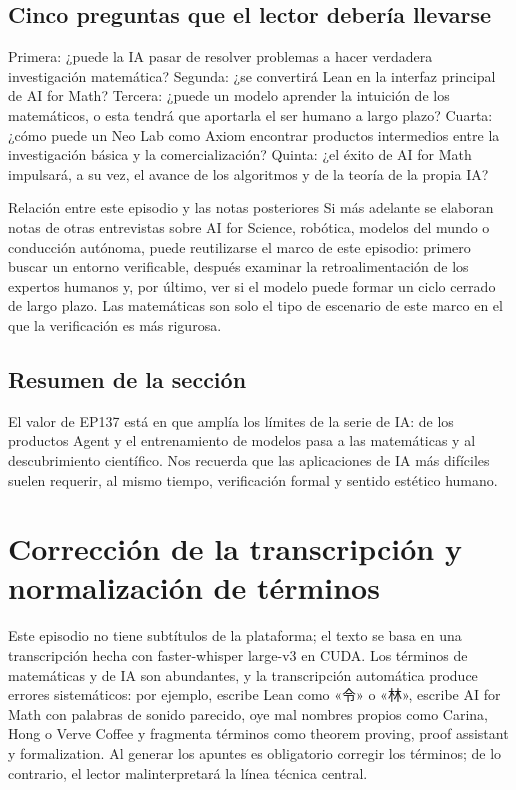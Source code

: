\documentclass[a4paper]{article}
\begin{document}
\subsection{Cinco preguntas que el lector debería llevarse}

Primera: ¿puede la IA pasar de resolver problemas a hacer verdadera investigación matemática? Segunda: ¿se convertirá Lean en la interfaz principal de AI for Math? Tercera: ¿puede un modelo aprender la intuición de los matemáticos, o esta tendrá que aportarla el ser humano a largo plazo? Cuarta: ¿cómo puede un Neo Lab como Axiom encontrar productos intermedios entre la investigación básica y la comercialización? Quinta: ¿el éxito de AI for Math impulsará, a su vez, el avance de los algoritmos y de la teoría de la propia IA?

\begin{knowledgebox}{Relación entre este episodio y las notas posteriores}
Si más adelante se elaboran notas de otras entrevistas sobre AI for Science, robótica, modelos del mundo o conducción autónoma, puede reutilizarse el marco de este episodio: primero buscar un entorno verificable, después examinar la retroalimentación de los expertos humanos y, por último, ver si el modelo puede formar un ciclo cerrado de largo plazo. Las matemáticas son solo el tipo de escenario de este marco en el que la verificación es más rigurosa.
\end{knowledgebox}

\subsection{Resumen de la sección}

El valor de EP137 está en que amplía los límites de la serie de IA: de los productos Agent y el entrenamiento de modelos pasa a las matemáticas y al descubrimiento científico. Nos recuerda que las aplicaciones de IA más difíciles suelen requerir, al mismo tiempo, verificación formal y sentido estético humano.
\section{Corrección de la transcripción y normalización de términos}

Este episodio no tiene subtítulos de la plataforma; el texto se basa en una transcripción hecha con faster-whisper large-v3 en CUDA. Los términos de matemáticas y de IA son abundantes, y la transcripción automática produce errores sistemáticos: por ejemplo, escribe Lean como «令» o «林», escribe AI for Math con palabras de sonido parecido, oye mal nombres propios como Carina, Hong o Verve Coffee y fragmenta términos como theorem proving, proof assistant y formalization. Al generar los apuntes es obligatorio corregir los términos; de lo contrario, el lector malinterpretará la línea técnica central.
\end{document}
